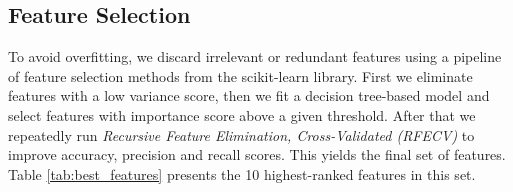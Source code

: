 

\subsection{Feature Selection}
\label{feature_selection}

To avoid overfitting, we discard irrelevant or redundant features using a pipeline of feature selection methods from the scikit-learn library. First we eliminate features with a low variance score, then we fit a decision tree-based model and select features with importance score above a given threshold. After that we repeatedly run \textit{Recursive Feature Elimination, Cross-Validated (RFECV)} to improve accuracy, precision and recall scores. This yields the final set of features. Table \ref{tab:best_features} presents the 10 highest-ranked features in this set.

